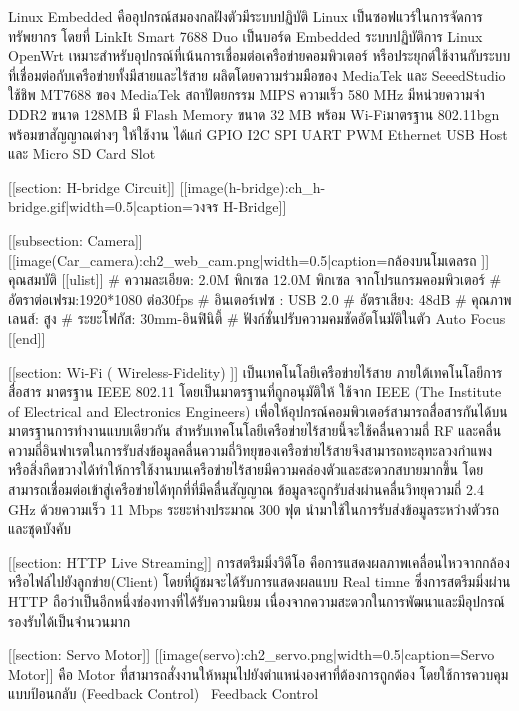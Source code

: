     Linux Embedded คืออุปกรณ์สมองกลฝังตัวมีระบบปฏิบัติ Linux เป็นซอฟแวร์ในการจัดการทรัพยากร 
    โดยที่ LinkIt Smart 7688 Duo เป็นบอร์ด Embedded ระบบปฏิบัติการ Linux OpenWrt  เหมาะสำหรับอุปกรณ์ที่เน้นการเชื่อมต่อเครือข่ายคอมพิวเตอร์ 
    หรือประยุกต์ใช้งานกับระบบที่เชื่อมต่อกับเครือข่ายทั้งมีสายและไร้สาย ผลิตโดยความร่วมมือของ MediaTek และ SeeedStudio ใช้ชิพ MT7688 ของ MediaTek 
    สถาปัตยกรรม MIPS ความเร็ว 580 MHz มีหน่วยความจำ DDR2 ขนาด 128MB มี Flash Memory ขนาด 32 MB พร้อม Wi-Fiมาตรฐาน 802.11bgn พร้อมขาสัญญาณต่างๆ 
    ให้ใช้งาน ได้แก่ GPIO I2C SPI UART PWM Ethernet USB Host และ Micro SD Card Slot


[[section: H-bridge Circuit]] 
    [[image(h-bridge):ch_h-bridge.gif|width=0.5|caption=วงจร H-Bridge]]

[[subsection: Camera]]
    [[image(Car_camera):ch2_web_cam.png|width=0.5|caption=กล้องบนโมเดลรถ ]]
    คุณสมบัติ
    [[ulist]]
        # ความละเอียด: 2.0M พิกเซล 12.0M พิกเซล จากโปรแกรมคอมพิวเตอร์
        # อัตราต่อเฟรม:1920*1080 ต่อ30fps
        # อินเตอร์เฟซ : USB 2.0
        # อัตราเสียง: 48dB
        # คุณภาพเลนส์: สูง
        # ระยะโฟกัส: 30mm-อินฟินิตี้
        # ฟังก์ชั่นปรับความคมชัดอัตโนมัติในตัว Auto Focus 
    [[end]]

[[section: Wi-Fi  ( Wireless-Fidelity)  ]]
    เป็นเทคโนโลยีเครือข่ายไร้สาย  ภายใต้เทคโนโลยีการสื่อสาร มาตรฐาน IEEE  802.11  โดยเป็นมาตรฐานที่ถูกอนุมัติให้ ใช้จาก IEEE (The Institute of Electrical and Electronics Engineers) 
    เพื่อให้อุปกรณ์คอมพิวเตอร์สามารถสื่อสารกันได้บนมาตรฐานการทำงานแบบเดียวกัน  สำหรับเทคโนโลยีเครือข่ายไร้สายนี้จะใช้คลื่นความถี่ RF 
    และคลื่นความถี่อินฟาเรตในการรับส่งข้อมูลคลื่นความถี่วิทยุของเครือข่ายไร้สายจึงสามารถทะลุทะลวงกำแพงหรือสิ่งกีดขวางได้ทำให้การใช้งานบนเครือข่ายไร้สายมีความคล่องตัวและสะดวกสบายมากขึ้น 
    โดยสามารถเชื่อมต่อเข้าสู่เครือข่ายได้ทุกที่ที่มีคลื่นสัญญาณ  ข้อมูลจะถูกรับส่งผ่านคลื่นวิทยุความถี่   2.4 GHz  ด้วยความเร็ว  11 Mbps  ระยะห่างประมาณ  300 ฟุต นำมาใช้ในการรับส่งข้อมูลระหว่างตัวรถและชุดบังคับ
 
[[section: HTTP Live Streaming]]
    การสตรีมมิ่งวิดีโอ คือการแสดงผลภาพเคลื่อนไหวจากกล้องหรือไฟล์ไปยังลูกข่าย(Client) โดยที่ผู้ชมจะได้รับการแสดงผลแบบ Real timne ซึ่งการสตรีมมิ่งผ่าน HTTP ถือว่าเป็นอีกหนึ่งช่องทางที่ได้รับความนิยม 
    เนื่องจากความสะดวกในการพัฒนาและมีอุปกรณ์รองรับได้เป็นจำนวนมาก

[[section: Servo Motor]]
    [[image(servo):ch2_servo.png|width=0.5|caption=Servo Motor]]
    คือ Motor ที่สามารถสั่งงานให้หมุนไปยังตำแหน่งองศาที่ต้องการถูกต้อง โดยใช้การควบคุมแบบป้อนกลับ (Feedback Control)  Feedback Control 

